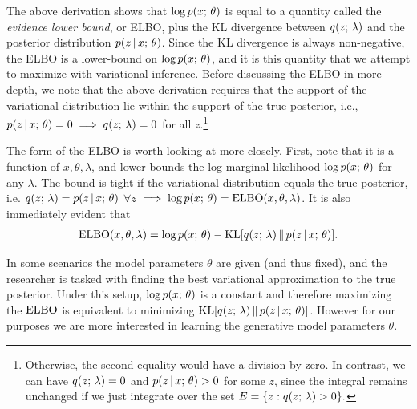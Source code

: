 \documentclass{article}
\begin{document}
The above derivation shows that $\log p(x ; \, \theta)$ is equal to a quantity called the \emph{evidence lower bound}, or ELBO, plus the KL divergence between $q(z ; \, \lambda)$ and the posterior distribution $p(z \,|\, x ; \, \theta)$. Since the KL divergence is always non-negative, the ELBO is a lower-bound on  $\log p(x ; \, \theta)$, and it is this quantity that we attempt to maximize with variational inference. Before discussing the ELBO in more depth, we note that the above derivation requires that the support of the variational distribution lie within the support of the true posterior, i.e., $p(z \,|\, x ; \, \theta) = 0 \implies q(z ; \, \lambda) = 0$ for all $z$.\footnote{Otherwise, the second equality would have a division by zero. In contrast, we can have $q(z ; \, \lambda) = 0$ and $p(z \,|\, x ; \, \theta) > 0$ for some $z$, since the integral remains unchanged if we just integrate over the set $E = \{z :  q(z ; \, \lambda) >0\}.$} 

The form of the ELBO is worth looking at more closely. First, note
that it is a function of $x, \theta, \lambda$, and lower bounds the log marginal likelihood $\log p(x ; \, \theta)$ for any $\lambda$. The bound is tight
if the variational distribution equals the true posterior, i.e. $q(z ; \, \lambda ) = p(z \,|\, x ; \, \theta)$ $\forall z$ $\implies \log p(x ; \, \theta) = \operatorname*{ELBO}(x, \theta, \lambda)$. 
It is also immediately evident that 
\begin{align*}
\operatorname*{ELBO}(x, \theta, \lambda) = \log p(x ; \, \theta) - \operatorname*{KL}[q(z ; \, \lambda)  \, \Vert \, p(z \,|\, x ; \, \theta)].
\end{align*}

In some scenarios the model parameters $\theta$ are given (and thus fixed), and the researcher is tasked with finding the best variational approximation to the true posterior. Under this setup, $\log p(x ; \, \theta)$ is a constant and therefore maximizing the $\operatorname*{ELBO}$ is equivalent to minimizing $\operatorname*{KL}[q(z ; \, \lambda)  \, \Vert \, p(z \,|\, x ; \, \theta)]$. 
However for our purposes we are more interested in learning the generative model parameters $\theta$.
\end{document}

